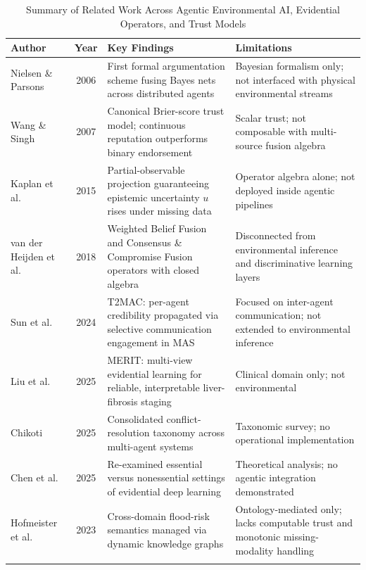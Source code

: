 \begin{table}[htbp]
\caption{Summary of Related Work Across Agentic Environmental AI, Evidential Operators, and Trust Models}
\label{tab:related_work}
\centering
\small
\renewcommand{\arraystretch}{1.35}
\begin{tabularx}{\linewidth}{p{2.8cm} c X X}
\toprule
\textbf{Author} & \textbf{Year} & \textbf{Key Findings} & \textbf{Limitations} \\
\midrule
Nielsen \& Parsons & 2006 & First formal argumentation scheme fusing Bayes nets across distributed agents & Bayesian formalism only; not interfaced with physical environmental streams \\ \addlinespace[0.4em]
Wang \& Singh & 2007 & Canonical Brier-score trust model; continuous reputation outperforms binary endorsement & Scalar trust; not composable with multi-source fusion algebra \\ \addlinespace[0.4em]
Kaplan et al. & 2015 & Partial-observable projection guaranteeing epistemic uncertainty $u$ rises under missing data & Operator algebra alone; not deployed inside agentic pipelines \\ \addlinespace[0.4em]
van der Heijden et al. & 2018 & Weighted Belief Fusion and Consensus \& Compromise Fusion operators with closed algebra & Disconnected from environmental inference and discriminative learning layers \\ \addlinespace[0.4em]
Sun et al. & 2024 & T2MAC: per-agent credibility propagated via selective communication engagement in MAS & Focused on inter-agent communication; not extended to environmental inference \\ \addlinespace[0.4em]
Liu et al. & 2025 & MERIT: multi-view evidential learning for reliable, interpretable liver-fibrosis staging & Clinical domain only; not environmental \\ \addlinespace[0.4em]
Chikoti & 2025 & Consolidated conflict-resolution taxonomy across multi-agent systems & Taxonomic survey; no operational implementation \\ \addlinespace[0.4em]
Chen et al. & 2025 & Re-examined essential versus nonessential settings of evidential deep learning & Theoretical analysis; no agentic integration demonstrated \\ \addlinespace[0.4em]
Hofmeister et al. & 2023 & Cross-domain flood-risk semantics managed via dynamic knowledge graphs & Ontology-mediated only; lacks computable trust and monotonic missing-modality handling \\ \addlinespace[0.4em]

\end{tabularx}
\end{table}
